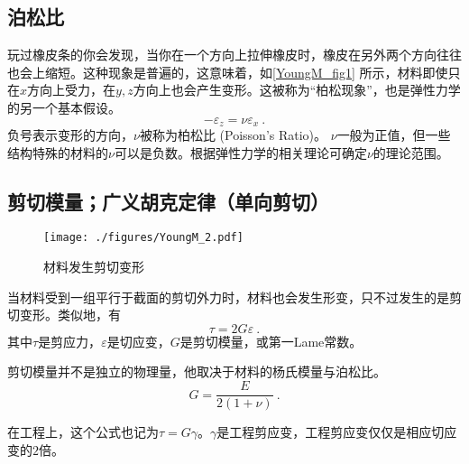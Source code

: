 \subsection{泊松比}
玩过橡皮条的你会发现，当你在一个方向上拉伸橡皮时，橡皮在另外两个方向往往也会上缩短。这种现象是普遍的，这意味着，如\autoref{YoungM_fig1} 所示，材料即使只在$x$方向上受力，在$y,z$方向上也会产生变形。这被称为“柏松现象”，也是弹性力学的另一个基本假设。
\begin{equation}
-\varepsilon_z= \nu \varepsilon_x~.
\end{equation}
负号表示变形的方向，$\nu$被称为柏松比 (Poisson's Ratio)。 $\nu$一般为正值，但一些结构特殊的材料的$\nu$可以是负数。根据弹性力学的相关理论可确定$\nu$的理论范围。%

\subsection{剪切模量；广义胡克定律（单向剪切）}
\begin{figure}[ht]
\centering
\texttt{[image: ./figures/YoungM\_2.pdf]}
\caption{材料发生剪切变形} \label{YoungM_fig2}
\end{figure}
当材料受到一组平行于截面的剪切外力时，材料也会发生形变，只不过发生的是剪切变形。类似地，有
\begin{equation}
\tau=2G\varepsilon~.
\end{equation}
其中$\tau$是剪应力，$\varepsilon$是切应变，$G$是剪切模量，或第一Lame常数。

剪切模量并不是独立的物理量，他取决于材料的杨氏模量与泊松比。
\begin{equation}
G = \frac{E}{2(1+\nu)}~.
\end{equation}

在工程上，这个公式也记为$\tau=G\gamma$。$\gamma$是工程剪应变，工程剪应变仅仅是相应切应变的$2$倍。
